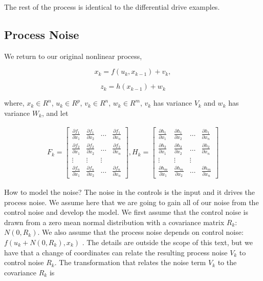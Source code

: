 The rest of the process is identical to the differential drive examples.

\hypertarget{process-noise}{%
\subsection{Process Noise}\label{process-noise}}

We return to our original nonlinear process,

\[x_k = f(u_k,x_{k-1}) + v_k,\]

\[z_k = h(x_{k-1})+w_k\]

where, \(x_k \in R^n\), \(u_k \in R^p\), \(v_k  \in R^n\),
\(w_k  \in R^m\), \(v_k\) has variance \(V_k\) and \(w_k\) has variance
\(W_k\), and let

\[\begin{aligned}
\displaystyle F_k =
  \begin{bmatrix} \frac{\partial f_1}{\partial x_1} & \frac{\partial f_1}{\partial x_2}  & \dots &
\frac{\partial f_1}{\partial x_n}  \\[8pt]
\frac{\partial f_2}{\partial x_1} & \frac{\partial f_2}{\partial x_2}  & \dots &
\frac{\partial f_2}{\partial x_n}  \\[8pt] \vdots & \vdots & \vdots \\[8pt]
\frac{\partial f_n}{\partial x_1} & \frac{\partial f_n}{\partial x_2}  & \dots &
\frac{\partial f_n}{\partial x_n}  \end{bmatrix},
\displaystyle H_k = \begin{bmatrix} \frac{\partial h_1}{\partial x_1} & \frac{\partial h_1}{\partial x_2}  & \dots &
\frac{\partial h_1}{\partial x_n}  \\[8pt]
\frac{\partial h_2}{\partial x_1} & \frac{\partial h_2}{\partial x_2}  & \dots &
\frac{\partial h_2}{\partial x_n}  \\[8pt] \vdots & \vdots & \vdots \\[8pt]
\frac{\partial h_m}{\partial x_1} & \frac{\partial h_m}{\partial x_2}  & \dots &
\frac{\partial h_m}{\partial x_n}  \end{bmatrix}
\end{aligned}\]

How to model the noise? The noise in the controls is the input and it
drives the process noise. We assume here that we are going to gain all
of our noise from the control noise and develop the model. We first
assume that the control noise is drawn from a zero mean normal
distribution with a covariance matrix \(R_k\): \(N(0,R_k)\). We also
assume that the process noise depends on control noise:
\(f(u_k + N(0,R_k) ,x_k)\) . The details are outside the scope of this
text, but we have that a change of coordinates can relate the resulting
process noise \(V_k\) to control noise \(R_k\). The transformation that
relates the noise term \(V_k\) to the covariance \(R_k\) is

